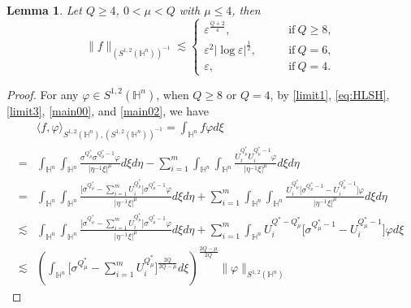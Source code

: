 \documentclass[11pt]{article}
\newtheorem{lemma}{Lemma}[section]
\begin{document}
  \begin{lemma}\label{main2}
 Let $Q\geq 4$, $0<\mu< Q$ with $\mu\leq 4$, then
  \begin{equation*}
  \|f\|_{(S^{1,2}(\mathbb{H}^{n}))^{-1}}\lesssim
  \begin{cases}
             \varepsilon^{\frac{Q+2}{4}}, \qquad & \mathrm{if} ~ Q\geq8, \\
             \varepsilon^2|\log \varepsilon|^{\frac{1}{2}},\qquad & \mathrm{if} ~ Q=6,\\
              \varepsilon, \qquad& \mathrm{if} ~ Q=4.
           \end{cases}
  \end{equation*}
\end{lemma}
\begin{proof}
For any $\varphi\in S^{1,2}(\mathbb{H}^{n})$, when $Q\geq8$ or $Q=4$, by \eqref{limit1}, \eqref{eq:HLSH}, \eqref{limit3}, \eqref{main00}, and \eqref{main02}, %
we have
\begin{align}\label{main20}
 &\langle f,\varphi\rangle_{S^{1,2}(\mathbb{H}^{n}),(S^{1,2}(\mathbb{H}^{n}))^{-1}} =\int_{\mathbb{H}^{n}}f\varphi d\xi \nonumber\\ =&\int_{\mathbb{H}^{n}}\int_{\mathbb{H}^{n}}\frac{\sigma^{Q^{\ast}_{\mu}}\sigma^{Q^{\ast}_{\mu}-1}\varphi}
{|\eta^{-1}\xi|^{\mu}}d\xi{d}\eta-\sum\limits_{i=1}^m
\int_{\mathbb{H}^{n}}\int_{\mathbb{H}^{n}}\frac{U_i^{Q^{\ast}_{\mu}}U_i^{Q^{\ast}_{\mu}-1}\varphi}
{|\eta^{-1}\xi|^{\mu}}d\xi{d}\eta \nonumber\\
=&\int_{\mathbb{H}^{n}}\int_{\mathbb{H}^{n}}\frac{\Big[\sigma^{Q^{\ast}_{\mu}}-\sum\limits_{i=1}^mU_i^{Q^{\ast}_{\mu}}\Big]\sigma^{Q^{\ast}_{\mu}-1}\varphi}
{|\eta^{-1}\xi|^{\mu}}d\xi{d}\eta+\sum\limits_{i=1}^m
\int_{\mathbb{H}^{n}}\int_{\mathbb{H}^{n}}\frac{U_i^{Q^{\ast}_{\mu}}\Big[\sigma^{Q^{\ast}_{\mu}-1}-U_i^{Q^{\ast}_{\mu}-1}\Big]\varphi}
{|\eta^{-1}\xi|^{\mu}}d\xi{d}\eta \nonumber\\
\lesssim &\int_{\mathbb{H}^{n}}\int_{\mathbb{H}^{n}}\frac{\Big[\sigma^{Q^{\ast}_{\mu}}-\sum\limits_{i=1}^mU_i^{Q^{\ast}_{\mu}}\Big]\sigma^{Q^{\ast}_{\mu}-1}\varphi}
{|\eta^{-1}\xi|^{\mu}}d\xi{d}\eta+\sum\limits_{i=1}^m
\int_{\mathbb{H}^{n}} U_i^{Q^*-Q^{\ast}_{\mu}}\Big[\sigma^{Q^{\ast}_{\mu}-1}-U_i^{Q^{\ast}_{\mu}-1}\Big]\varphi
d\xi \nonumber\\
\lesssim & \left(\int_{\mathbb{H}^{n}}\bigg[\sigma^{Q^{\ast}_{\mu}}-\sum\limits_{i=1}^mU_i^{Q^{\ast}_{\mu}}\bigg]^{\frac{2Q}{2Q-\mu}}d\xi\right)^{\frac{2Q-\mu}{2Q}}\|\varphi\|_{S^{1,2}(\mathbb{H}^{n})}

\end{align}
\end{proof}
\end{document}
